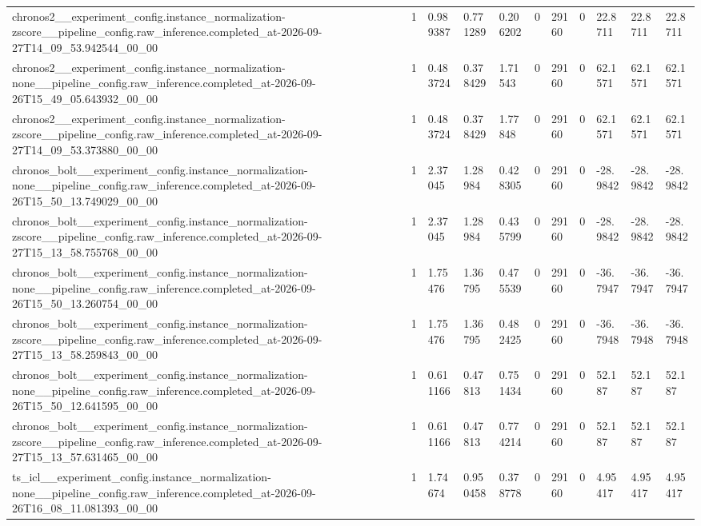 \begin{tabular}{lllllllllll}
chronos2\_\_experiment\_config.instance\_normalization-zscore\_\_pipeline\_config.raw\_inference.completed\_at-2026-09-27T14\_09\_53.942544\_00\_00 & 1 & 0.989387 & 0.771289 & 0.206202 & 0 & 29160 & 0 & 22.8711 & 22.8711 & 22.8711 \\
chronos2\_\_experiment\_config.instance\_normalization-none\_\_pipeline\_config.raw\_inference.completed\_at-2026-09-26T15\_49\_05.643932\_00\_00 & 1 & 0.483724 & 0.378429 & 1.71543 & 0 & 29160 & 0 & 62.1571 & 62.1571 & 62.1571 \\
chronos2\_\_experiment\_config.instance\_normalization-zscore\_\_pipeline\_config.raw\_inference.completed\_at-2026-09-27T14\_09\_53.373880\_00\_00 & 1 & 0.483724 & 0.378429 & 1.77848 & 0 & 29160 & 0 & 62.1571 & 62.1571 & 62.1571 \\
chronos\_bolt\_\_experiment\_config.instance\_normalization-none\_\_pipeline\_config.raw\_inference.completed\_at-2026-09-26T15\_50\_13.749029\_00\_00 & 1 & 2.37045 & 1.28984 & 0.428305 & 0 & 29160 & 0 & -28.9842 & -28.9842 & -28.9842 \\
chronos\_bolt\_\_experiment\_config.instance\_normalization-zscore\_\_pipeline\_config.raw\_inference.completed\_at-2026-09-27T15\_13\_58.755768\_00\_00 & 1 & 2.37045 & 1.28984 & 0.435799 & 0 & 29160 & 0 & -28.9842 & -28.9842 & -28.9842 \\
chronos\_bolt\_\_experiment\_config.instance\_normalization-none\_\_pipeline\_config.raw\_inference.completed\_at-2026-09-26T15\_50\_13.260754\_00\_00 & 1 & 1.75476 & 1.36795 & 0.475539 & 0 & 29160 & 0 & -36.7947 & -36.7947 & -36.7947 \\
chronos\_bolt\_\_experiment\_config.instance\_normalization-zscore\_\_pipeline\_config.raw\_inference.completed\_at-2026-09-27T15\_13\_58.259843\_00\_00 & 1 & 1.75476 & 1.36795 & 0.482425 & 0 & 29160 & 0 & -36.7948 & -36.7948 & -36.7948 \\
chronos\_bolt\_\_experiment\_config.instance\_normalization-none\_\_pipeline\_config.raw\_inference.completed\_at-2026-09-26T15\_50\_12.641595\_00\_00 & 1 & 0.611166 & 0.47813 & 0.751434 & 0 & 29160 & 0 & 52.187 & 52.187 & 52.187 \\
chronos\_bolt\_\_experiment\_config.instance\_normalization-zscore\_\_pipeline\_config.raw\_inference.completed\_at-2026-09-27T15\_13\_57.631465\_00\_00 & 1 & 0.611166 & 0.47813 & 0.774214 & 0 & 29160 & 0 & 52.187 & 52.187 & 52.187 \\
ts\_icl\_\_experiment\_config.instance\_normalization-none\_\_pipeline\_config.raw\_inference.completed\_at-2026-09-26T16\_08\_11.081393\_00\_00 & 1 & 1.74674 & 0.950458 & 0.378778 & 0 & 29160 & 0 & 4.95417 & 4.95417 & 4.95417 \\

\end{tabular}
